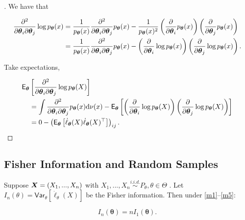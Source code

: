 \begin{proof}[]
    
We have that

\[\begin{split} \frac{\partial^2}{\partial \boldsymbol{\theta}_i \partial \boldsymbol{\theta}_j} \log p_{\boldsymbol{\theta}}(x) &= \frac{1}{p_{\boldsymbol{\theta}}(x)} \frac{\partial^2}{\partial \boldsymbol{\theta}_i \partial \boldsymbol{\theta}_j} p_{\boldsymbol{\theta}}(x) - \frac{1}{p_{\boldsymbol{\theta}}(x)^2} \left( \frac{\partial}{\partial \boldsymbol{\theta}_i} p_{\boldsymbol{\theta}}(x) \right) \left( \frac{\partial}{\partial \boldsymbol{\theta}_j} p_{\boldsymbol{\theta}}(x) \right) \\ &= \frac{1}{p_{\boldsymbol{\theta}}(x)} \frac{\partial^2}{\partial \boldsymbol{\theta}_i \partial \boldsymbol{\theta}_j} p_{\boldsymbol{\theta}}(x) - \left( \frac{\partial}{\partial \boldsymbol{\theta}_i} \log p_{\boldsymbol{\theta}}(x) \right) \left( \frac{\partial}{\partial \boldsymbol{\theta}_j} \log p_{\boldsymbol{\theta}}(x) \right). \end{split}\]

Take expectations,

\[\begin{split} \mathsf{E}_{\boldsymbol{\theta}} & \left[ \frac{\partial^2}{\partial \boldsymbol{\theta}_i \partial \boldsymbol{\theta}_j} \log p_{\boldsymbol{\theta}}(X) \right] \\ & = \int \frac{\partial^2}{\partial \boldsymbol{\theta}_i \partial \boldsymbol{\theta}_j} p_{\boldsymbol{\theta}}(x) \mathrm{d} \nu(x) - \mathsf{E}_{\boldsymbol{\theta}} \left[ \left( \frac{\partial}{\partial \boldsymbol{\theta}_i} \log p_{\boldsymbol{\theta}}(X) \right) \left( \frac{\partial}{\partial \boldsymbol{\theta}_j} \log p_{\boldsymbol{\theta}}(X) \right) \right] \\ & = 0 - \left( \mathsf{E}_{\boldsymbol{\theta}} \left[ \dot{\ell}_{\boldsymbol{\theta}}(X) \dot{\ell}_{\boldsymbol{\theta}}(X)^{\top} \right] \right)_{ij}. \end{split}\]
\end{proof}


\subsection{Fisher Information and Random Samples}%
\label{sub:firs}
\begin{pro}[]
    
Suppose \(\boldsymbol{X} = (X_1, ..., X_n)\) with
\(X_1, ..., X_n \overset{i.i.d.}{\sim} P_{\theta}, \theta \in \Theta\) .
Let \(I_n(\theta) = \mathsf{Var}_{\theta} [\dot{\ell}_{\theta}(X)]\) be
the Fisher information. Then under \ref{m1}--\ref{m5}:

\[
	I_n(\boldsymbol{\theta}) = nI_1(\boldsymbol{\theta}).
\]
\end{pro}

